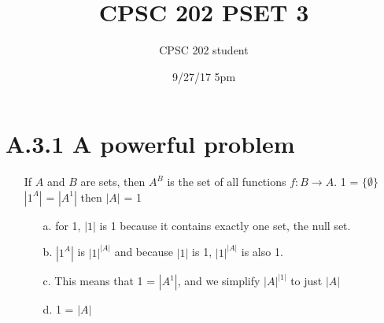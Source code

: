 \documentclass[12pt]{article}
\title{CPSC 202 PSET 3}
\author{CPSC 202 student}
\date{9/27/17 5pm}
\begin{document}
\maketitle

\newcommand{\E}{\mathrm{E}}
\newcommand{\Var}{\mathrm{Var}}
\newcommand{\Cov}{\mathrm{Cov}}

\section*{A.3.1 A powerful problem}
\begin{enumerate}
  \item[] If ${A}$ and ${B}$ are sets, then ${A^B}$ is the set of all functions ${f: B \rightarrow A}$. 1 = ${\{\emptyset\}}$ \\ ${|1^A|}$ = ${|A^1|}$ then ${|A|}$ = 1
    \begin{enumerate}
      \item[a.] for 1, ${|1|}$ is 1 because it contains exactly one set, the null set.
      \item[b.] ${|1^A|}$ is ${|1|^{|A|}}$ and because ${|1|}$ is 1, ${|1|^{|A|}}$ is also 1.
      \item[c.] This means that 1 = ${|A^1|}$, and we simplify ${|A|^{|1|}}$ to just ${|A|}$
      \item[d.] 1 = ${|A|}$
    \end{enumerate}
\end{enumerate}
\end{document}
